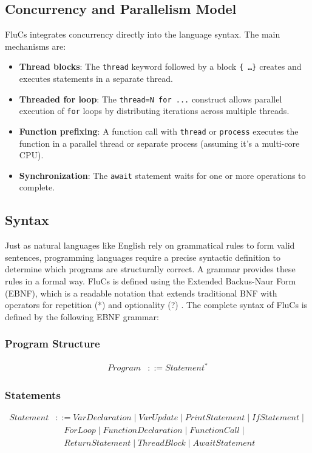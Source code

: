 \subsection{Concurrency and Parallelism Model}
FluCs integrates concurrency directly into the language syntax. The main mechanisms are:
\begin{itemize}
    \item \textbf{Thread blocks}: The \texttt{thread} keyword followed by a block \texttt{\{ \dots \}} creates and executes statements in a separate thread.
    \item \textbf{Threaded for loop}: The \texttt{thread=N for ...} construct allows parallel execution of \texttt{for} loops by distributing iterations across multiple threads.
    \item \textbf{Function prefixing}: A function call with \texttt{thread} or \texttt{process} executes the function in a parallel thread or separate process (assuming it's a multi-core CPU).
    \item \textbf{Synchronization}: The \texttt{await} statement waits for one or more operations to complete.
\end{itemize}
\subsection{Syntax} \label{subch:Syntax}
Just as natural languages like English rely on grammatical rules to form valid sentences, programming languages require a precise syntactic definition to determine which programs are structurally correct. A grammar provides these rules in a formal way. FluCs is defined using the Extended Backus-Naur Form (EBNF), which is a readable notation that extends traditional BNF with operators for repetition (*) and optionality (?) \cite{sipser2013}.
The complete syntax of FluCs is defined by the following EBNF grammar:
\subsubsection{Program Structure}
\begin{align*}
Program &::= Statement^*
\end{align*}
\subsubsection{Statements}
\begin{align*}
Statement &::= VarDeclaration \mid VarUpdate \mid PrintStatement \mid IfStatement \mid \\
&\quad ForLoop \mid FunctionDeclaration \mid FunctionCall \mid \\
&\quad ReturnStatement \mid ThreadBlock \mid AwaitStatement
\end{align*}
